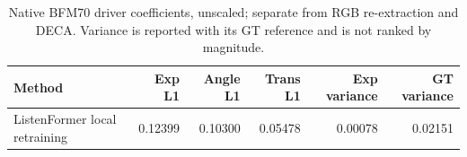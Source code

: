 \begin{table}[H]
\centering\small
\caption{Native BFM70 driver coefficients, unscaled; separate from RGB re-extraction and DECA. Variance is reported with its GT reference and is not ranked by magnitude.}
\label{tab:vico-more-native}
\setlength{\tabcolsep}{4pt}
\begin{tabular}{lrrrrr}
\toprule
Method & Exp L1 & Angle L1 & Trans L1 & Exp variance & GT variance \\
\midrule
ListenFormer local retraining & 0.12399 & 0.10300 & 0.05478 & 0.00078 & 0.02151 \\
\bottomrule
\end{tabular}
\end{table}
